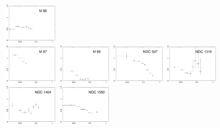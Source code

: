 \documentclass{aa}
\begin{document}
\begin{figure}[!]
                \includegraphics[width=0.236\textwidth,trim={0 0 0 0},clip]{fig_M86_Fe.pdf} \\
                \includegraphics[width=0.236\textwidth,trim={0 0 0 0},clip]{fig_M87_Fe.pdf}
                \includegraphics[width=0.236\textwidth,trim={0 0 0 0},clip]{fig_M89_Fe.pdf}
                \includegraphics[width=0.236\textwidth,trim={0 0 0 0},clip]{fig_NGC507_Fe.pdf}
                \includegraphics[width=0.236\textwidth,trim={0 0 0 0},clip]{fig_NGC1316_Fe.pdf} \\
                \includegraphics[width=0.236\textwidth,trim={0 0 0 0},clip]{fig_NGC1404_Fe.pdf}
                \includegraphics[width=0.236\textwidth,trim={0 0 0 0},clip]{fig_NGC1550_Fe.pdf}

\end{figure}
\end{document}
